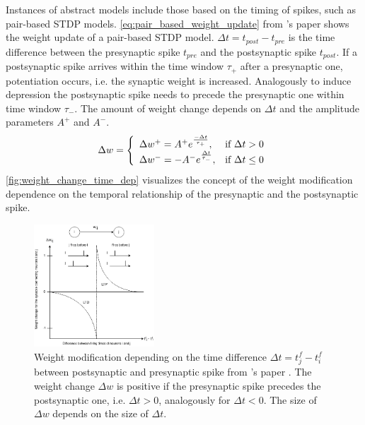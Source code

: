 Instances of abstract models include those based on the timing of spikes, such as pair-based \ac{STDP} models.
\autoref{eq:pair_based_weight_update} from \authorsSynapticPlasticity{}'s paper \cite{Synaptic_plasticity} shows the weight update of a pair-based \ac{STDP} model.
$\Delta t = t_{post} - t_{pre}$ is the time difference between the presynaptic spike $t_{pre}$ and the postsynaptic spike $t_{post}$.
If a postsynaptic spike arrives within the time window $\tau_+$ after a presynaptic one, potentiation occurs, i.e. the synaptic weight is increased. 
Analogously to induce depression the postsynaptic spike needs to precede the presynaptic one within time window $\tau_-$.
The amount of weight change depends on $\Delta t $ and the amplitude parameters $A^+$ and $A^-$.
%
\begin{equation}
    \centering
    \label{eq:pair_based_weight_update}
    \Delta w = \left\{
        \begin{array}{ll}
        \Delta w^+ = A^+ e^{\frac{-\Delta t}{\tau_+}}, & \text{if } \Delta t > 0 \\
        \Delta w^- = -A^- e^{\frac{\Delta t}{\tau_-}}, & \text{if } \Delta t \le 0 \\
        \end{array}
        \right.
\end{equation}
%
\autoref{fig:weight_change_time_dep} visualizes the concept of 
the weight modification dependence on the temporal relationship of the presynaptic and the postsynaptic spike.
%
\begin{figure}[htbp]
    \center
    \includegraphics[width=0.4\textwidth]{pictures/weight_change_time_dep_altered.png}
    \caption{Weight modification depending on the time difference $\Delta t = t_j^f - t_i^f$ 
    between postsynaptic and presynaptic spike from \authorsSNNweightTime{}'s paper \cite{snn_weight_time}.
    The weight change $\Delta w$ is positive if the presynaptic spike precedes the postsynaptic one, 
    i.e. $\Delta t > 0$, analogously for $\Delta t < 0$.
    The size of $\Delta w$ depends on the size of $\Delta t$.}
    \label{fig:weight_change_time_dep}
\end{figure}

